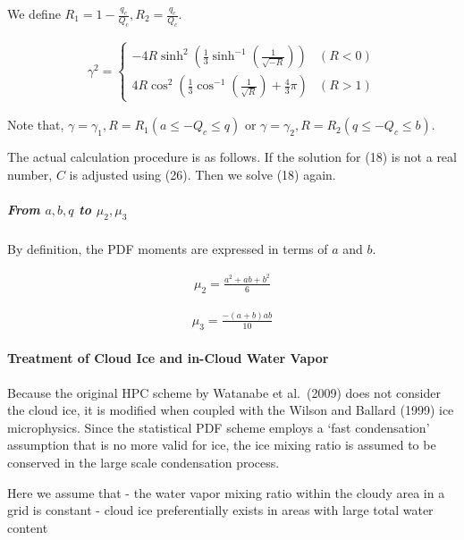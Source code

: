 We define \(R_{1}=1-\frac{q_{c}}{Q_{c}}, R_{2}=\frac{q_{c}}{Q_{c}}\).

\begin{eqnarray}
\gamma^{2}=\left\{\begin{array}{ll}
-4 R \sinh ^{2}\left(\frac{1}{3} \sinh ^{-1}\left(\frac{1}{\sqrt{-R}}\right)\right) & (R<0) \\
4 R \cos ^{2}\left(\frac{1}{3} \cos ^{-1}\left(\frac{1}{\sqrt{R}}\right)+\frac{4}{3} \pi\right) & (R>1)
\end{array}\right.
\label{E08-26}
\end{eqnarray}

Note that, \(\gamma=\gamma_{1}, R=R_{1}\left(a \leq-Q_{c} \leq q\right)\) or \(\gamma=\gamma_{2}, R=R_{2}\left(q \leq-Q_{c} \leq b\right)\).

The actual calculation procedure is as follows. If the solution for (18) is not a real number, \(C\) is adjusted using (26). Then we solve (18) again.

\hypertarget{from-abq-to-mu_2-mu_3}{%
\subparagraph{\texorpdfstring{From \(a,b,q\) to \(\mu_{2}, \mu_{3}\)}{From a,b,q to \textbackslash mu\_\{2\}, \textbackslash mu\_\{3\}}}\label{from-abq-to-mu_2-mu_3}}

By definition, the PDF moments are expressed in terms of \(a\) and \(b\).

\begin{eqnarray}
\mu_{2}=\frac{a^{2}+ab+b^{2}}{6}
\end{eqnarray}

\begin{eqnarray}
\mu_{3}=\frac{-(a+b) ab}{10}
\end{eqnarray}

\hypertarget{treatment-of-cloud-ice-and-in-cloud-water-vapor}{%
\paragraph{Treatment of Cloud Ice and in-Cloud Water Vapor}\label{treatment-of-cloud-ice-and-in-cloud-water-vapor}}

Because the original HPC scheme by Watanabe et al.~(2009) does not consider the cloud ice, it is modified when coupled with the Wilson and Ballard (1999) ice microphysics. Since the statistical PDF
scheme employs a `fast condensation' assumption that is no more valid for ice, the ice mixing ratio is assumed to be conserved in the large scale condensation process.

Here we assume that - the water vapor mixing ratio within the cloudy area in a grid is constant - cloud ice preferentially exists in areas with large total water content

